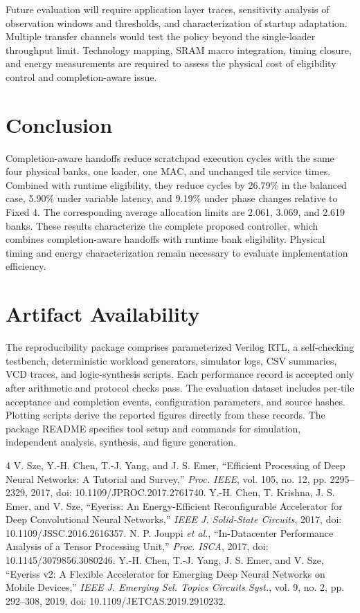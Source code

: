 \documentclass[twocolumn,10pt]{article}
\begin{document}
Future evaluation will require application layer traces, sensitivity
analysis of observation windows and thresholds, and characterization of
startup adaptation. Multiple transfer channels would test the policy beyond
the single-loader throughput limit. Technology mapping, SRAM macro
integration, timing closure, and energy measurements are required to
assess the physical cost of eligibility control and completion-aware issue.

\section{Conclusion}
Completion-aware handoffs reduce scratchpad execution cycles with
the same four physical banks, one loader, one MAC, and unchanged tile
service times. Combined with runtime eligibility, they reduce cycles by
26.79\% in the balanced case, 5.90\% under variable latency, and 9.19\% under
phase changes relative to Fixed 4. The corresponding average allocation
limits are 2.061, 3.069, and 2.619 banks. These results characterize the
complete proposed controller, which combines completion-aware handoffs
with runtime bank eligibility. Physical timing and energy characterization
remain necessary to evaluate implementation efficiency.

\section{Artifact Availability}
The reproducibility package comprises parameterized Verilog RTL, a
self-checking testbench, deterministic workload generators, simulator
logs, CSV summaries, VCD traces, and logic-synthesis scripts. Each
performance record is accepted only after arithmetic and protocol checks
pass. The evaluation dataset includes per-tile acceptance and completion
events, configuration parameters, and source hashes. Plotting scripts
derive the reported figures directly from these records. The package
README specifies tool setup and commands for simulation, independent
analysis, synthesis, and figure generation.

\begin{thebibliography}{4}
 V. Sze, Y.-H. Chen, T.-J. Yang, and J. S. Emer,
``Efficient Processing of Deep Neural Networks: A Tutorial and Survey,''
\emph{Proc. IEEE}, vol. 105, no. 12, pp. 2295--2329, 2017,
doi: 10.1109/JPROC.2017.2761740.
 Y.-H. Chen, T. Krishna, J. S. Emer, and V. Sze,
``Eyeriss: An Energy-Efficient Reconfigurable Accelerator for Deep
Convolutional Neural Networks,'' \emph{IEEE J. Solid-State Circuits}, 2017,
doi: 10.1109/JSSC.2016.2616357.
 N. P. Jouppi \emph{et al.},
``In-Datacenter Performance Analysis of a Tensor Processing Unit,''
\emph{Proc. ISCA}, 2017, doi: 10.1145/3079856.3080246.
 Y.-H. Chen, T.-J. Yang, J. S. Emer, and V. Sze,
``Eyeriss v2: A Flexible Accelerator for Emerging Deep Neural Networks on
Mobile Devices,'' \emph{IEEE J. Emerging Sel. Topics Circuits Syst.},
vol. 9, no. 2, pp. 292--308, 2019, doi: 10.1109/JETCAS.2019.2910232.
\end{thebibliography}
\end{document}
